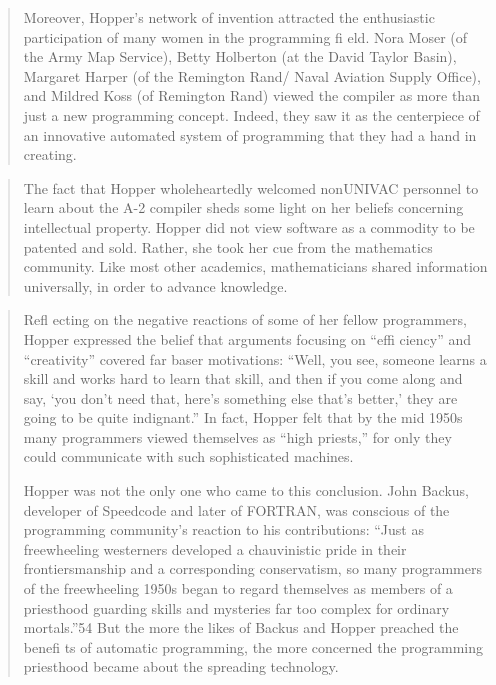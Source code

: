 \begin{quotation}
Moreover, Hopper’s network of invention attracted the enthusiastic participation of many women in the programming fi eld.
Nora Moser (of the Army Map Service), Betty Holberton (at the
David Taylor Basin), Margaret Harper (of the Remington Rand/
Naval Aviation Supply Office), and Mildred Koss (of Remington
Rand) viewed the compiler as more than just a new programming concept. Indeed, they saw it as the centerpiece of an innovative automated system of programming that they had a hand
in creating.
\end{quotation}
\begin{quotation}
The fact that Hopper wholeheartedly welcomed nonUNIVAC personnel to learn about the A-2 compiler sheds some
light on her beliefs concerning intellectual property. Hopper did
not view software as a commodity to be patented and sold.
Rather, she took her cue from the mathematics community. Like
most other academics, mathematicians shared information universally, in order to advance knowledge.
\end{quotation}
\begin{quotation}
Refl ecting on the negative reactions of some of her fellow
programmers, Hopper expressed the belief that arguments focusing on “effi ciency” and “creativity” covered far baser motivations:
“Well, you see, someone learns a skill and works hard to learn
that skill, and then if you come along and say, ‘you don’t need
that, here’s something else that’s better,’ they are going to be quite
indignant.” In fact, Hopper felt that by the mid 1950s many
programmers viewed themselves as “high priests,” for only they
could communicate with such sophisticated machines.

Hopper was not the only one who came to this conclusion.
John Backus, developer of Speedcode and later of FORTRAN,
was conscious of the programming community’s reaction to his
contributions: “Just as freewheeling westerners developed a chauvinistic pride in their frontiersmanship and a corresponding conservatism, so many programmers of the freewheeling 1950s began
to regard themselves as members of a priesthood guarding skills
and mysteries far too complex for ordinary mortals.”54 But the
more the likes of Backus and Hopper preached the benefi ts of
automatic programming, the more concerned the programming
priesthood became about the spreading technology.
\end{quotation}
